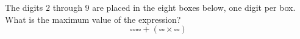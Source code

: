 The digits $2$ through $9$ are placed in the eight boxes below, one digit per box. What is the maximum value of the expression?
\[
\square\square\square\square+\left(\square\square\times\square\square\right)
\]
